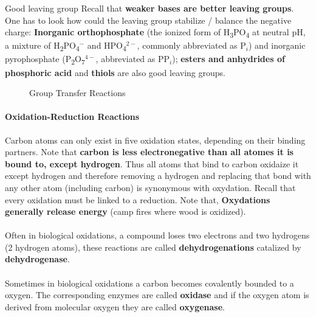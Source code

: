 \documentclass[../main.tex]{subfiles}
\begin{document}
\begin{RemarkWithTitel}{Good leaving group}
	Recall that \textbf{weaker bases are better leaving groups}. One has to look how could the leaving group stabilize / balance the negative charge: 
	\textbf{Inorganic orthophosphate} (the ionized form of H\textsubscript{3}PO\textsubscript{4} at neutral pH, a mixture of H\textsubscript{2}PO\textsubscript{4}$^-$ and HPO\textsubscript{4}$^{2-}$, commonly abbreviated as \( \text{P}_i \)) and inorganic pyrophosphate (P\textsubscript{2}O\textsubscript{7}$^{4-}$, abbreviated as \( \text{PP}_i \)); \textbf{esters and anhydrides of phosphoric acid} and \textbf{thiols} are also good leaving groups. 
\end{RemarkWithTitel}

\begin{figure}[h]
	\centering
	\hfill
	\caption{Group Transfer Reactions}
\end{figure}


\paragraph{Oxidation-Reduction Reactions}
Carbon atoms can only exist in five oxidation states, depending on their binding partners. Note that \textbf{carbon is less electronegative than all atomes it is bound to, except hydrogen}. Thus all atoms that bind to carbon oxidaize it except hydrogen and therefore removing a hydrogen and replacing that bond with any other atom (including carbon) is synonymous with oxydation. Recall that every oxidation must be linked to a reduction. Note that, \textbf{Oxydations generally release energy} (camp fires where wood is oxidized). \\
\\
Often in biological oxidations, a compound loses two electrons and two hydrogens (2 hydrogen atoms), these reactions are called \textbf{dehydrogenations} catalized by \textbf{\gls{dehydrogenase}}. \\
\\
Sometimes in biological oxidations a carbon becomes covalently bounded to a oxygen. The corresponding enzymes are called \textbf{\gls{oxidase}} and if the oxygen atom is derived from molecular oxygen they are called \textbf{\gls{oxygenase}}. 
\end{document}

